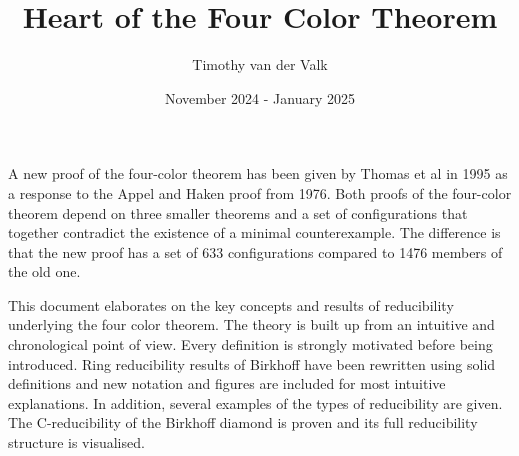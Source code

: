 \documentclass{article}
\title{Heart of the Four Color Theorem}
\author{Timothy van der Valk}
\date{November 2024 - January 2025}
\begin{document}
\maketitle

A new proof of the four-color theorem has been given by Thomas et al \cite{thomas} in 1995 as a response to the Appel and Haken proof from 1976. Both proofs of the four-color theorem depend on three smaller theorems and a set of configurations that together contradict the existence of a minimal counterexample. The difference is that the new proof has a set of 633 configurations compared to 1476 members of the old one.

This document elaborates on the key concepts and results of reducibility underlying the four color theorem. The theory is built up from an intuitive and chronological point of view. Every definition is strongly motivated before being introduced. Ring reducibility results of Birkhoff have been rewritten using solid definitions and new notation and figures are included for most intuitive explanations. In addition, several examples of the types of reducibility are given. The C-reducibility of the Birkhoff diamond is proven and its full reducibility structure is visualised.

\tableofcontents

\pagebreak






\pagebreak
\printbibliography
\end{document}
